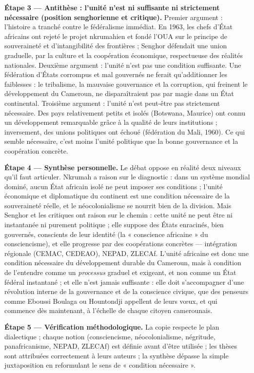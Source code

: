 \documentclass[11pt]{article}
\begin{document}
\begin{exoresolu}
\textbf{Étape 3 — Antithèse : l'unité n'est ni suffisante ni strictement nécessaire (position senghorienne et critique).} Premier argument : l'histoire a tranché contre le fédéralisme immédiat. En 1963, les chefs d'État africains ont rejeté le projet nkrumahien et fondé l'OUA sur le principe de souveraineté et d'intangibilité des frontières ; Senghor défendait une union graduelle, par la culture et la coopération économique, respectueuse des réalités nationales. Deuxième argument : l'unité n'est pas une condition suffisante. Une fédération d'États corrompus et mal gouvernés ne ferait qu'additionner les faiblesses : le tribalisme, la mauvaise gouvernance et la corruption, qui freinent le développement du Cameroun, ne disparaîtraient pas par magie dans un État continental. Troisième argument : l'unité n'est peut-être pas strictement nécessaire. Des pays relativement petits et isolés (Botswana, Maurice) ont connu un développement remarquable grâce à la qualité de leurs institutions ; inversement, des unions politiques ont échoué (fédération du Mali, 1960). Ce qui semble nécessaire, c'est moins l'unité politique que la bonne gouvernance et la coopération concrète.

\textbf{Étape 4 — Synthèse personnelle.} Le débat oppose en réalité deux niveaux qu'il faut articuler. Nkrumah a raison sur le diagnostic : dans un système mondial dominé, aucun État africain isolé ne peut imposer ses conditions ; l'unité économique et diplomatique du continent est une condition nécessaire de la souveraineté réelle, et le néocolonialisme se nourrit bien de la division. Mais Senghor et les critiques ont raison sur le chemin : cette unité ne peut être ni instantanée ni purement politique ; elle suppose des États enracinés, bien gouvernés, conscients de leur identité (la « conscience africaine » du consciencisme), et elle progresse par des coopérations concrètes — intégration régionale (CEMAC, CEDEAO), NEPAD, ZLECAf. L'unité africaine est donc une condition nécessaire du développement durable du Cameroun, mais à condition de l'entendre comme un \emph{processus} graduel et exigeant, et non comme un État fédéral instantané ; et elle n'est jamais suffisante : elle doit s'accompagner d'une révolution interne de la gouvernance et de la conscience civique, que des penseurs comme Eboussi Boulaga ou Hountondji appellent de leurs vœux, et qui commence dès maintenant, à l'échelle de chaque citoyen camerounais.

\textbf{Étape 5 — Vérification méthodologique.} La copie respecte le plan dialectique ; chaque notion (consciencisme, néocolonialisme, négritude, panafricanisme, NEPAD, ZLECAf) est définie avant d'être utilisée ; les thèses sont attribuées correctement à leurs auteurs ; la synthèse dépasse la simple juxtaposition en reformulant le sens de « condition nécessaire ».
\end{exoresolu}
\end{document}
